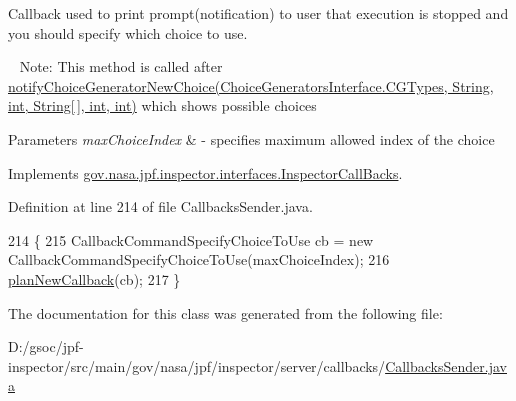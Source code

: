 Callback used to print prompt(notification) to user that execution is stopped and you should specify which choice to use. 

~\newline
Note\+: This method is called after \hyperlink{}{notify\+Choice\+Generator\+New\+Choice(\+Choice\+Generators\+Interface.\+C\+G\+Types, String, int, String\mbox{[}$\,$\mbox{]}, int, int)} which shows possible choices


\begin{DoxyParams}{Parameters}
{\em max\+Choice\+Index} & -\/ specifies maximum allowed index of the choice \\
\hline
\end{DoxyParams}


Implements \hyperlink{interfacegov_1_1nasa_1_1jpf_1_1inspector_1_1interfaces_1_1_inspector_call_backs_a95bd37f4f3ad147514c86fa77856b51d}{gov.\+nasa.\+jpf.\+inspector.\+interfaces.\+Inspector\+Call\+Backs}.



Definition at line 214 of file Callbacks\+Sender.\+java.


\begin{DoxyCode}
214                                                         \{
215       CallbackCommandSpecifyChoiceToUse cb = \textcolor{keyword}{new} CallbackCommandSpecifyChoiceToUse(maxChoiceIndex);
216       \hyperlink{classgov_1_1nasa_1_1jpf_1_1inspector_1_1server_1_1callbacks_1_1_callbacks_sender_ab4ea578bd6190b6e61b2445a79dab78a}{planNewCallback}(cb);
217     \}
\end{DoxyCode}


The documentation for this class was generated from the following file\+:\begin{DoxyCompactItemize}
\item 
D\+:/gsoc/jpf-\/inspector/src/main/gov/nasa/jpf/inspector/server/callbacks/\hyperlink{_callbacks_sender_8java}{Callbacks\+Sender.\+java}\end{DoxyCompactItemize}
